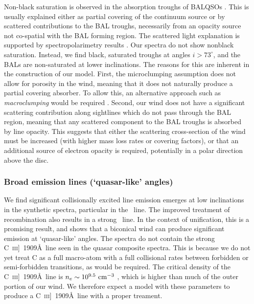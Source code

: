 \documentclass[useAMS,usenatbib]{mn2e_x}
\begin{document}
Non-black saturation is observed in the absorption troughs of BALQSOs \citep{arav1999b,arav1999}.
This is usually explained either as  partial covering of the continuum
source or by scattered contributions to the BAL troughs, necessarily
from an opacity source not co-spatial with the BAL forming region.
The scattered light explanation is supported by spectropolarimetry results
\citep{lamy2000}. Our spectra do not show nonblack saturation.
Instead, we find black, saturated troughs at angles $i > 73^\circ$, and the BALs
are non-saturated at lower inclinations. The reasons for this are inherent in the construction of our model. 
First, the microclumping assumption does not allow for 
porosity in the wind, meaning that it does not naturally produce
a partial covering absorber. To allow this, an alternative approach
such as {\em macroclumping} would be required \citep[e.g.][]{hamann2008,surlan2012}.
Second, our wind does not have a significant scattering 
contribution along sightlines which do not pass through the BAL region,
meaning that any scattered component to the BAL troughs is absorbed by line opacity.
This suggests that either the scattering cross-section of the wind must
be increased (with higher mass loss rates or covering factors), or 
that an additional source of electron opacity is required, potentially
in a polar direction above the disc.  


\subsubsection{Broad emission lines (`quasar-like' angles)}

We find significant collisionally excited line emission emerges
at low inclinations in the synthetic spectra, particular in the \civ\ line.
The improved treatment of recombination also results in a strong \la\ line. 
In the context of unification, this is a promising result, 
and shows that a biconical wind can produce significant 
emission at `quasar-like' angles. 
The spectra do not contain the strong C~\textsc{iii}]~1909\AA\, 
line seen in the quasar composite spectra. 
This is because we do not yet treat C as a full macro-atom with a 
full collisional rates between forbidden
or semi-forbidden transitions, as would be required.
The critical density of the C~\textsc{iii}]~1909\AA\, line 
is $n_e\sim10^{9.5}~\rm{cm^{-3}}$ \citep{wei1988}, which is higher than much of the 
outer portion of our wind. 
We therefore expect a model with these 
parameters to produce a C~\textsc{iii}]~1909\AA\ line
with a proper treament. 
\end{document}
